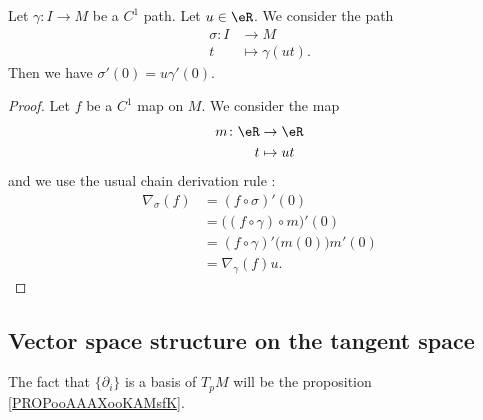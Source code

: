 \begin{lemma}        \label{LEMooMHSQooQyTZCg}
	Let \( \gamma\colon I\to M\) be a \( C^1\) path. Let \( u\in \eR\). We consider the path
	\begin{equation}
		\begin{aligned}
			\sigma\colon I & \to M               \\
			t              & \mapsto \gamma(ut).
		\end{aligned}
	\end{equation}
	Then we have \( \sigma'(0)=u\gamma'(0)\).
\end{lemma}

\begin{proof}
	Let \( f\) be a \( C^1\) map on \( M\). We consider the map
	\begin{equation}
		\begin{aligned}
			m\colon \eR & \to \eR    \\
			t           & \mapsto ut
		\end{aligned}
	\end{equation}
	and we use the usual chain derivation rule :
	\begin{subequations}
		\begin{align}
			\nabla_{\sigma}(f) & =(f\circ\sigma)'(0)                    \\
			                   & =\Big( (f\circ\gamma)\circ m \Big)'(0) \\
			                   & =(f\circ\gamma)'\big( m(0) \big)m'(0)  \\
			                   & =\nabla_{\gamma}(f)u.
		\end{align}
	\end{subequations}
\end{proof}


\subsection{Vector space structure on the tangent space}

The fact that \( \{ \partial_i \}\) is a basis of \( T_pM\) will be the proposition \ref{PROPooAAAXooKAMsfK}.

